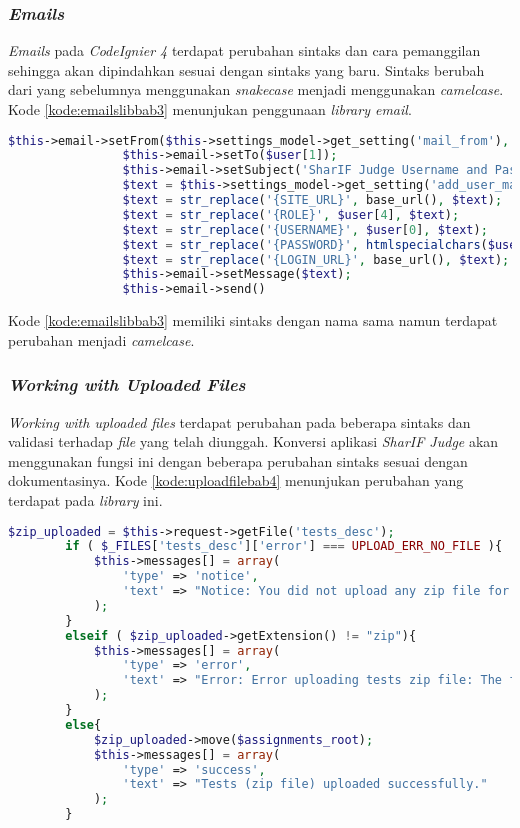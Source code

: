 \subsubsection{\textit{Emails}}
\textit{Emails} pada \textit{CodeIgnier 4} terdapat perubahan sintaks dan cara pemanggilan sehingga akan dipindahkan sesuai dengan sintaks yang baru. Sintaks berubah dari yang sebelumnya menggunakan \textit{snakecase} menjadi menggunakan \textit{camelcase}. Kode \ref{kode:emailslibbab3} menunjukan penggunaan \textit{library email}.

\begin{lstlisting}[language=PHP, caption=Perubahan penggunaan sintaks pada \textit{library emails}, label=kode:emailslibbab3]
$this->email->setFrom($this->settings_model->get_setting('mail_from'), $this->settings_model->get_setting('mail_from_name'));
				$this->email->setTo($user[1]);
				$this->email->setSubject('SharIF Judge Username and Password');
				$text = $this->settings_model->get_setting('add_user_mail');
				$text = str_replace('{SITE_URL}', base_url(), $text);
				$text = str_replace('{ROLE}', $user[4], $text);
				$text = str_replace('{USERNAME}', $user[0], $text);
				$text = str_replace('{PASSWORD}', htmlspecialchars($user[3]), $text);
				$text = str_replace('{LOGIN_URL}', base_url(), $text);
				$this->email->setMessage($text);
				$this->email->send()
\end{lstlisting}

Kode \ref{kode:emailslibbab3} memiliki sintaks dengan nama sama namun terdapat perubahan menjadi \textit{camelcase}.

\subsubsection{\textit{Working with Uploaded Files}}
\textit{Working with uploaded files} terdapat perubahan pada beberapa sintaks dan validasi terhadap \textit{file} yang telah diunggah. Konversi aplikasi \textit{SharIF Judge} akan menggunakan fungsi ini dengan beberapa perubahan sintaks sesuai dengan dokumentasinya. Kode \ref{kode:uploadfilebab4} menunjukan perubahan yang terdapat pada \textit{library} ini. 
\begin{lstlisting}[language=PHP, caption=Perancangan perubahan \textit{library upload} pada \textit{CodeIgniter 4}, label=kode:uploadfilebab4]
$zip_uploaded = $this->request->getFile('tests_desc');
		if ( $_FILES['tests_desc']['error'] === UPLOAD_ERR_NO_FILE ){
			$this->messages[] = array(
				'type' => 'notice',
				'text' => "Notice: You did not upload any zip file for tests. If needed, upload by editing assignment."
			);
		}
		elseif ( $zip_uploaded->getExtension() != "zip"){
			$this->messages[] = array(
				'type' => 'error',
				'text' => "Error: Error uploading tests zip file: The filetype you are attempting to upload is not allowed."
			);
		}
		else{
			$zip_uploaded->move($assignments_root);
			$this->messages[] = array(
				'type' => 'success',
				'text' => "Tests (zip file) uploaded successfully."
			);
		}
\end{lstlisting}

